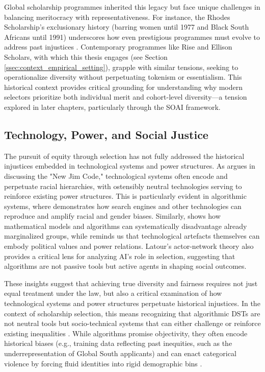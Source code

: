 Global scholarship programmes inherited this legacy but face unique challenges in balancing meritocracy with representativeness. For instance, the Rhodes Scholarship's exclusionary history (barring women until 1977 and Black South Africans until 1991) underscores how even prestigious programmes must evolve to address past injustices \cite{Ziegler_2008}. Contemporary programmes like Rise and Ellison Scholars, with which this thesis engages (see Section \ref{ssec:context_empirical_setting}), grapple with similar tensions, seeking to operationalize diversity without perpetuating tokenism or essentialism. This historical context provides critical grounding for understanding why modern selectors prioritize both individual merit and cohort-level diversity—a tension explored in later chapters, particularly through the SOAI framework.

\subsection{Technology, Power, and Social Justice}\label{ssec:context_tech_power_justice}
The pursuit of equity through selection has not fully addressed the historical injustices embedded in technological systems and power structures. As \textcite{benjamin2019race} argues in discussing the "New Jim Code," technological systems often encode and perpetuate racial hierarchies, with ostensibly neutral technologies serving to reinforce existing power structures. This is particularly evident in algorithmic systems, where \textcite{noble2018algorithms} demonstrates how search engines and other technologies can reproduce and amplify racial and gender biases. Similarly, \textcite{oneill2016weapons} shows how mathematical models and algorithms can systematically disadvantage already marginalized groups, while \textcite{winner1980artefacts} reminds us that technological artefacts themselves can embody political values and power relations. Latour's actor-network theory also provides a critical lens for analyzing AI's role in selection, suggesting that algorithms are not passive tools but active agents in shaping social outcomes.

These insights suggest that achieving true diversity and fairness requires not just equal treatment under the law, but also a critical examination of how technological systems and power structures perpetuate historical injustices. In the context of scholarship selection, this means recognizing that algorithmic DSTs are not neutral tools but socio-technical systems that can either challenge or reinforce existing inequalities \cite{barocas_fairness_2016}. While algorithms promise objectivity, they often encode historical biases (e.g., training data reflecting past inequities, such as the underrepresentation of Global South applicants) and can enact categorical violence by forcing fluid identities into rigid demographic bins \cite{scheuerman2019computers, bowker1999sorting}.

